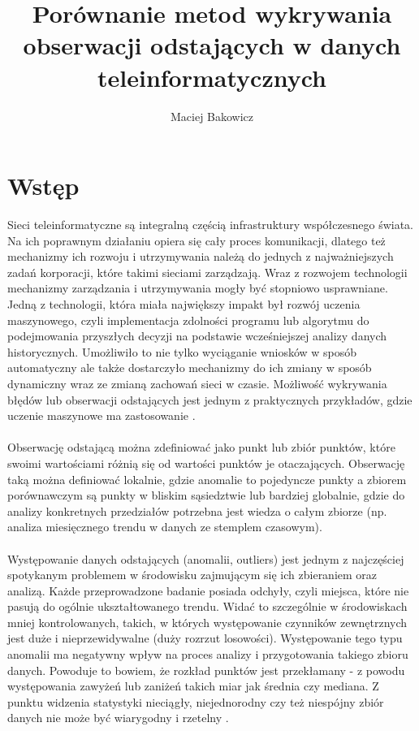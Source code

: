 \documentclass[eng,printmode]{mgr}
\title{Porównanie metod wykrywania obserwacji odstających w danych teleinformatycznych}
\author{Maciej Bakowicz}
\begin{document}

\maketitle 

\tableofcontents 

\chapter{Wstęp}  
Sieci teleinformatyczne są integralną częścią infrastruktury współczesnego świata. Na ich poprawnym działaniu opiera się cały proces komunikacji, dlatego też mechanizmy ich rozwoju i utrzymywania należą do jednych z najważniejszych zadań korporacji, które takimi sieciami zarządzają. Wraz z rozwojem technologii mechanizmy zarządzania i utrzymywania mogły być stopniowo usprawniane. Jedną z technologii, która miała największy impakt był rozwój uczenia maszynowego, czyli implementacja zdolności programu lub algorytmu do podejmowania przyszłych decyzji na podstawie wcześniejszej analizy danych historycznych. Umożliwiło to nie tylko wyciąganie wniosków w sposób automatyczny ale także dostarczyło mechanizmy do ich zmiany w sposób dynamiczny wraz ze zmianą zachowań sieci w czasie. Możliwość wykrywania błędów lub obserwacji odstających jest jednym z praktycznych przykładów, gdzie uczenie maszynowe ma zastosowanie \cite{ml-book}.
\\\\
Obserwację odstającą można zdefiniować jako punkt lub zbiór punktów, które swoimi wartościami różnią się od wartości punktów je otaczających. Obserwację taką można definiować lokalnie, gdzie anomalie to pojedyncze punkty a zbiorem porównawczym są punkty w bliskim sąsiedztwie lub bardziej globalnie, gdzie do analizy konkretnych przedziałów potrzebna jest wiedza o całym zbiorze (np. analiza miesięcznego trendu w danych ze stemplem czasowym). 
\\ \\
Występowanie danych odstających (anomalii, outliers) jest jednym z najczęściej spotykanym problemem w środowisku zajmującym się ich zbieraniem oraz analizą. Każde przeprowadzone badanie posiada odchyły, czyli miejsca, które nie pasują do ogólnie ukształtowanego trendu. Widać to szczególnie w środowiskach mniej kontrolowanych, takich, w których występowanie czynników zewnętrznych jest duże i nieprzewidywalne (duży rozrzut losowości). Występowanie tego typu anomalii ma negatywny wpływ na proces analizy i przygotowania takiego zbioru danych. Powoduje to bowiem, że rozkład punktów jest przekłamany - z powodu występowania zawyżeń lub zaniżeń takich miar jak średnia czy mediana. Z punktu widzenia statystyki nieciągły, niejednorodny czy też niespójny zbiór danych nie może być wiarygodny i rzetelny \cite{outliers-impact}.
\end{document}
